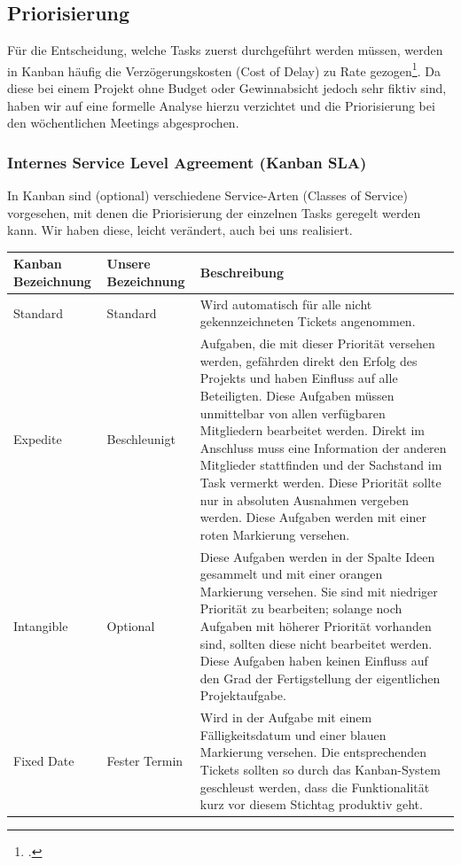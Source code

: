 \subsection{Priorisierung}
\label{subsec:priorisierung}
Für die Entscheidung, welche Tasks zuerst durchgeführt werden müssen, werden in Kanban häufig die Verzögerungskosten (Cost of Delay) zu Rate gezogen\footcite{wikiKanban}. Da diese bei einem Projekt ohne Budget oder Gewinnabsicht jedoch sehr fiktiv sind, haben wir auf eine formelle Analyse hierzu verzichtet und die Priorisierung bei den wöchentlichen Meetings abgesprochen.

\subsubsection{Internes Service Level Agreement (Kanban SLA)}
In Kanban sind (optional) verschiedene Service-Arten (Classes of Service) vorgesehen, mit denen die Priorisierung der einzelnen Tasks geregelt werden kann. Wir haben diese, leicht verändert, auch bei uns realisiert.

\begin{minipage}{\textwidth}
\begin{center}
\begin{tabular}{p{2.2cm}p{2.4cm}p{10.8cm}}
\toprule
Kanban \newline Bezeichnung & Unsere \newline Bezeichnung & Beschreibung \\
\midrule
Standard & Standard & Wird automatisch für alle nicht gekennzeichneten Tickets angenommen. \\
Expedite & Beschleunigt & Aufgaben, die mit dieser Priorität versehen werden, gefährden direkt den Erfolg des Projekts und haben Einfluss auf alle Beteiligten. Diese Aufgaben müssen unmittelbar von allen verfügbaren Mitgliedern bearbeitet werden. Direkt im Anschluss muss eine Information der anderen Mitglieder stattfinden und der Sachstand im Task vermerkt werden. Diese Priorität sollte nur in absoluten Ausnahmen vergeben werden. Diese Aufgaben werden mit einer roten Markierung versehen. \\
Intangible & Optional & Diese Aufgaben werden in der Spalte Ideen gesammelt und mit einer orangen Markierung versehen. Sie sind mit niedriger Priorität zu bearbeiten; solange noch Aufgaben mit höherer Priorität vorhanden sind, sollten diese nicht bearbeitet werden. Diese Aufgaben haben keinen Einfluss auf den Grad der Fertigstellung der eigentlichen Projektaufgabe.\\
Fixed Date & Fester \newline Termin & Wird in der Aufgabe mit einem Fälligkeitsdatum und einer blauen Markierung versehen. Die entsprechenden Tickets sollten so durch das Kanban-System geschleust werden, dass die Funktionalität kurz vor diesem Stichtag produktiv geht. \\
\bottomrule
\end{tabular}
\end{center}
\end{minipage}

